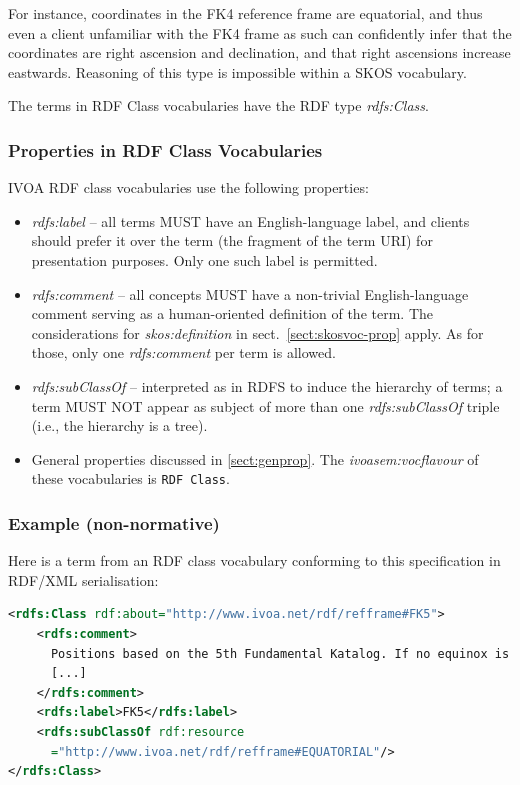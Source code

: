 \documentclass[11pt,a4paper]{ivoa}
\newcommand{\vocterm}[1]{\emph{\color{termcolor}#1}}
\begin{document}
For instance, coordinates in the FK4 reference frame are equatorial, and
thus even a client unfamiliar with the FK4 frame as such can confidently
infer that the coordinates are right ascension and declination, and that
right ascensions increase eastwards.  Reasoning of this type is
impossible within a SKOS vocabulary.

The terms in RDF Class vocabularies have the RDF type 
\vocterm{rdfs:Class}.

\subsubsection{Properties in RDF Class Vocabularies}
\label{sect:classvoc-prop}

IVOA RDF class vocabularies use the following properties:

\begin{itemize}
\item \vocterm{rdfs:label} -- all terms MUST have an English-language
label, and clients should prefer it over the term (the fragment of the
term URI) for presentation purposes.  Only
one such label is permitted.

\item \vocterm{rdfs:comment} -- all concepts MUST have a non-trivial
English-language comment serving as a human-oriented definition of the
term.  The considerations for \vocterm{skos:definition} in
sect.~\ref{sect:skosvoc-prop} apply.  As for those, only one
\vocterm{rdfs:comment} per term is allowed.

\item \vocterm{rdfs:subClassOf} -- interpreted as in RDFS to induce
the hierarchy of terms; a term MUST NOT appear as subject of more than
one \vocterm{rdfs:subClassOf} triple (i.e., the hierarchy is a tree).

\item General properties discussed in \ref{sect:genprop}.
The \vocterm{ivoasem:vocflavour} of these vocabularies is 
\verb|RDF Class|.
\end{itemize}

\subsubsection{Example (non-normative)}

Here is a term from an RDF class vocabulary conforming to this
specification in RDF/XML serialisation:

\begin{lstlisting}[language=XML]
<rdfs:Class rdf:about="http://www.ivoa.net/rdf/refframe#FK5">
    <rdfs:comment>
      Positions based on the 5th Fundamental Katalog. If no equinox is
      [...]
    </rdfs:comment>
    <rdfs:label>FK5</rdfs:label>
    <rdfs:subClassOf rdf:resource
      ="http://www.ivoa.net/rdf/refframe#EQUATORIAL"/>
</rdfs:Class>
\end{lstlisting}
\end{document}

